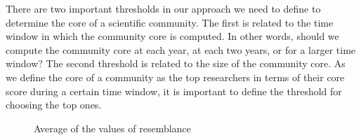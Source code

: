 There are two important thresholds in our approach we need to define to determine the core of a scientific community.  The first is related to the time window in which the 
community core is computed. In other words, should we compute the community core at each year, at each two years, or for a larger time window? The second threshold is related to the
size of the community core. As we define the core of a community as the top researchers in terms of their core score during a certain time window, it is important to define the
threshold for choosing the top ones.
\begin{figure}[!htb]
  \begin{center}
  \end{center}
\caption{Average of the values of resemblance}
 \label{fig:averange_values_resemblance}
\end{figure}


